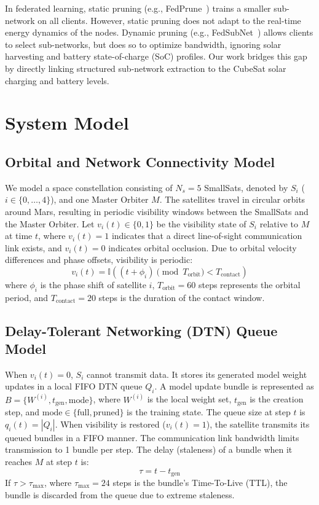 \documentclass[journal,twocolumn]{IEEEtran}
\begin{document}
In federated learning, static pruning (e.g., FedPrune~\cite{li2021fedprune}) trains a smaller sub-network on all clients. However, static pruning does not adapt to the real-time energy dynamics of the nodes. Dynamic pruning (e.g., FedSubNet~\cite{subnetwork2022}) allows clients to select sub-networks, but does so to optimize bandwidth, ignoring solar harvesting and battery state-of-charge (SoC) profiles. Our work bridges this gap by directly linking structured sub-network extraction to the CubeSat solar charging and battery levels.

\section{System Model}
\label{sec:system}

\subsection{Orbital and Network Connectivity Model}
We model a space constellation consisting of $N_s = 5$ SmallSats, denoted by $S_i$ ($i \in \{0, \dots, 4\}$), and one Master Orbiter $M$. The satellites travel in circular orbits around Mars, resulting in periodic visibility windows between the SmallSats and the Master Orbiter. Let $v_i(t) \in \{0, 1\}$ be the visibility state of $S_i$ relative to $M$ at time $t$, where $v_i(t) = 1$ indicates that a direct line-of-sight communication link exists, and $v_i(t) = 0$ indicates orbital occlusion. Due to orbital velocity differences and phase offsets, visibility is periodic:
\begin{equation}
    v_i(t) = \mathbb{I}\left( (t + \phi_i) \pmod{T_{\text{orbit}}} < T_{\text{contact}} \right)
\end{equation}
where $\phi_i$ is the phase shift of satellite $i$, $T_{\text{orbit}} = 60$ steps represents the orbital period, and $T_{\text{contact}} = 20$ steps is the duration of the contact window.

\subsection{Delay-Tolerant Networking (DTN) Queue Model}
When $v_i(t) = 0$, $S_i$ cannot transmit data. It stores its generated model weight updates in a local FIFO DTN queue $Q_i$. A model update bundle is represented as $B = \{ W^{(i)}, t_{\text{gen}}, \text{mode} \}$, where $W^{(i)}$ is the local weight set, $t_{\text{gen}}$ is the creation step, and $\text{mode} \in \{\text{full}, \text{pruned}\}$ is the training state. The queue size at step $t$ is $q_i(t) = |Q_i|$. When visibility is restored ($v_i(t) = 1$), the satellite transmits its queued bundles in a FIFO manner. The communication link bandwidth limits transmission to 1 bundle per step. The delay (staleness) of a bundle when it reaches $M$ at step $t$ is:
\begin{equation}
    \tau = t - t_{\text{gen}}
\end{equation}
If $\tau > \tau_{\max}$, where $\tau_{\max} = 24$ steps is the bundle's Time-To-Live (TTL), the bundle is discarded from the queue due to extreme staleness.
\end{document}
